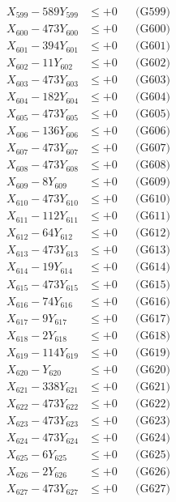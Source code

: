 \documentclass[a4paper,10pt]{article}
\begin{document}
{\begin{align}
X_{599} - 589Y_{599} &\leq +0 && \text{(G599)} \\
X_{600} - 473Y_{600} &\leq +0 && \text{(G600)} \\
\allowbreak
X_{601} - 394Y_{601} &\leq +0 && \text{(G601)} \\
X_{602} - 11Y_{602} &\leq +0 && \text{(G602)} \\
X_{603} - 473Y_{603} &\leq +0 && \text{(G603)} \\
X_{604} - 182Y_{604} &\leq +0 && \text{(G604)} \\
X_{605} - 473Y_{605} &\leq +0 && \text{(G605)} \\
X_{606} - 136Y_{606} &\leq +0 && \text{(G606)} \\
X_{607} - 473Y_{607} &\leq +0 && \text{(G607)} \\
X_{608} - 473Y_{608} &\leq +0 && \text{(G608)} \\
X_{609} - 8Y_{609} &\leq +0 && \text{(G609)} \\
X_{610} - 473Y_{610} &\leq +0 && \text{(G610)} \\
\allowbreak
X_{611} - 112Y_{611} &\leq +0 && \text{(G611)} \\
X_{612} - 64Y_{612} &\leq +0 && \text{(G612)} \\
X_{613} - 473Y_{613} &\leq +0 && \text{(G613)} \\
X_{614} - 19Y_{614} &\leq +0 && \text{(G614)} \\
X_{615} - 473Y_{615} &\leq +0 && \text{(G615)} \\
X_{616} - 74Y_{616} &\leq +0 && \text{(G616)} \\
X_{617} - 9Y_{617} &\leq +0 && \text{(G617)} \\
X_{618} - 2Y_{618} &\leq +0 && \text{(G618)} \\
X_{619} - 114Y_{619} &\leq +0 && \text{(G619)} \\
X_{620} - Y_{620} &\leq +0 && \text{(G620)} \\
\allowbreak
X_{621} - 338Y_{621} &\leq +0 && \text{(G621)} \\
X_{622} - 473Y_{622} &\leq +0 && \text{(G622)} \\
X_{623} - 473Y_{623} &\leq +0 && \text{(G623)} \\
X_{624} - 473Y_{624} &\leq +0 && \text{(G624)} \\
X_{625} - 6Y_{625} &\leq +0 && \text{(G625)} \\
X_{626} - 2Y_{626} &\leq +0 && \text{(G626)} \\
X_{627} - 473Y_{627} &\leq +0 && \text{(G627)} \\

\end{align}}
\end{document}
